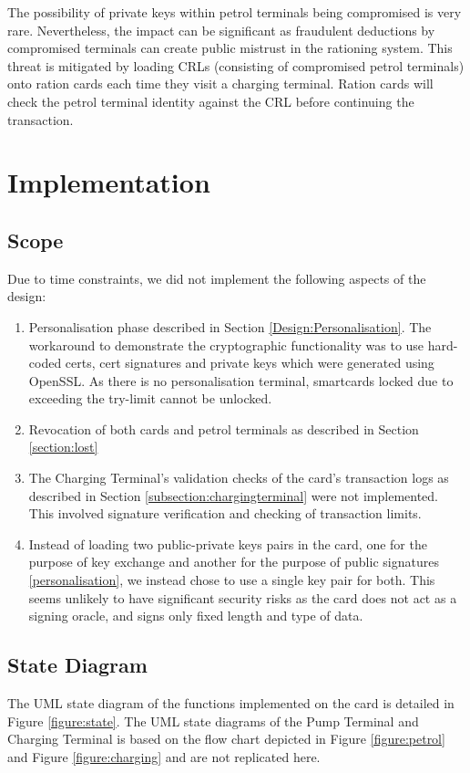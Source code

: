 \documentclass[a4paper,10pt]{llncs}
\begin{document}
The possibility of private keys within petrol terminals being compromised is very rare. Nevertheless, the impact can be significant as fraudulent deductions by compromised terminals can create public mistrust in the rationing system. This threat is mitigated by loading CRLs (consisting of compromised petrol terminals) onto ration cards each time they visit a charging terminal. Ration cards will check the petrol terminal identity against the CRL before continuing the transaction.

\section{Implementation}

\subsection{Scope}
Due to time constraints, we did not implement the following aspects of the design:
\label{chapter:limitations}
\begin{enumerate}
 \item Personalisation phase described in Section \ref{Design:Personalisation}. The workaround to demonstrate the cryptographic functionality was to use hard-coded certs, cert signatures and private keys which were generated using OpenSSL. As there is no personalisation terminal, smartcards locked due to exceeding the try-limit cannot be unlocked.
  \item Revocation of both cards and petrol terminals as described in Section \ref{section:lost}
  \item The Charging Terminal's validation checks of the card's transaction logs as described in Section \ref{subsection:chargingterminal} were not implemented. This involved signature verification and checking of transaction limits.
  \item Instead of loading two public-private keys pairs in the card, one for the purpose of key exchange and another for the purpose of public signatures \ref{personalisation}, we instead chose to use a single key pair for both. This seems unlikely to have significant security risks as the card does not act as a signing oracle, and signs only fixed length and type of data.
\end{enumerate}

\subsection{State Diagram}
The UML state diagram of the functions implemented on the card is detailed in Figure \ref{figure:state}. The UML state diagrams of the Pump Terminal and Charging Terminal is based on the flow chart depicted in Figure \ref{figure:petrol} and Figure \ref{figure:charging} and are not replicated here.
\end{document}
